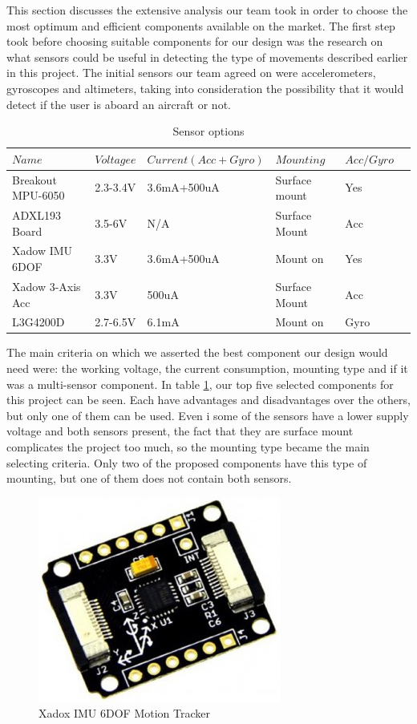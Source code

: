 This section discusses the extensive analysis our team took in order to choose the most optimum and efficient components available on the market. The first step took before choosing suitable components for our design was the research on what sensors could be useful in detecting the type of movements described earlier in this project. The initial sensors our team agreed on were accelerometers, gyroscopes and altimeters, taking into consideration the possibility that it would detect if the user is aboard an aircraft or not.
\begin{table}[h]
	\centering
	\begin{tabular}{llllll}
		\hline
		$Name$ & $Voltagee$ & $Current(Acc+Gyro)$ & $Mounting$ & $Acc/Gyro$ \\
		\hline
		Breakout MPU-6050 & 2.3-3.4V & 3.6mA+500uA & Surface mount & Yes\\
		\hline
		 ADXL193 Board & 3.5-6V & N/A & Surface Mount & Acc \\
		\hline
		Xadow IMU 6DOF  & 3.3V &  3.6mA+500uA & Mount on & Yes \\
		\hline
		Xadow 3-Axis Acc &  3.3V & 500uA & Surface Mount & Acc \\
		\hline
		 L3G4200D &  2.7-6.5V & 6.1mA & Mount on  & Gyro \\
		\hline
	\end{tabular}
	\caption{Sensor options}
	\label{table: componentsx}
\end{table}

The main criteria on which we asserted the best component our design would need were: the working voltage, the current consumption, mounting type and if it was a multi-sensor component. In table \ref{table: componentsx}, our top five selected components for this project can be seen. Each have advantages and disadvantages over the others, but only one of them can be used. Even i some of the sensors have a lower supply voltage and both sensors present, the fact that they are surface mount complicates the project too much, so the mounting type became the main selecting criteria. Only two of the proposed components have this type of mounting, but one of them does not contain both sensors.

\begin{figure}
\centering
\includegraphics[scale=0.4]{figures/Xadow_IMU_6DOF.PNG}
\caption{Xadox IMU 6DOF Motion Tracker \label{fig:xadox}}
\end{figure}


